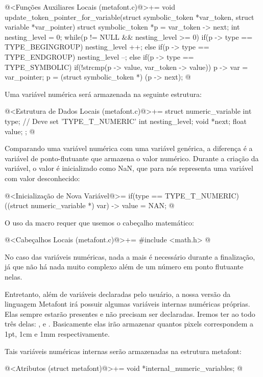 \iniciocodigo
@<Funções Auxiliares Locais (metafont.c)@>+=
void update_token_pointer_for_variable(struct symbolic_token *var_token,
                                      struct variable *var_pointer){
  struct symbolic_token *p = var_token -> next;
  int nesting_level = 0;
  while(p != NULL && nesting_level >= 0){
    if(p -> type == TYPE_BEGINGROUP)
      nesting_level ++;
    else if(p -> type == TYPE_ENDGROUP)
      nesting_level --;
    else if(p -> type == TYPE_SYMBOLIC){
      if(!strcmp(p -> value, var_token -> value)){
        p -> var = var_pointer;
      }
    }
    p = (struct symbolic_token *) (p -> next);
  }
}
@
\fimcodigo


Uma variável numérica será armazenada na seguinte estrutura:

\iniciocodigo
@<Estrutura de Dados Locais (metafont.c)@>+=
struct numeric_variable{
  int type; // Deve set 'TYPE_T_NUMERIC'
  int nesting_level;
  void *next;
  float value;
};
@
\fimcodigo

Comparando uma variável numérica com uma variável genérica, a
diferença é a variável de ponto-flutuante  que
armazena o valor numérico. Durante a criação da variável, o valor é
inicializado como NaN, que para nós representa uma variável com valor
desconhecido:

\iniciocodigo
@<Inicialização de Nova Variável@>=
if(type == TYPE_T_NUMERIC){
  ((struct numeric_variable *) var) -> value = NAN;
}
@
\fimcodigo

O uso da macro  requer que usemos o cabeçalho
matemático:

\iniciocodigo
@<Cabeçalhos Locais (metafont.c)@>+=
#include <math.h>
@
\fimcodigo

No caso das variáveis numéricas, nada a mais é necessário durante a
finalização, já que não há nada muito complexo além de um número em
ponto flutuante nelas.

Entretanto, além de variáveis declaradas pelo usuário, a nossa versão
da linguagem Metafont irá possuir algumas variáveis internas numéricas
próprias. Elas sempre estarão presentes e não precisam ser
declaradas. Iremos ter ao todo três
delas: ,  e . Basicamente
elas irão armazenar quantos pixels correspondem a 1pt, 1cm e 1mm
respectivamente.

Tais variáveis numéricas internas serão armazenadas na estrutura
metafont:

\iniciocodigo
@<Atributos (struct metafont)@>+=
void *internal_numeric_variables;
@
\fimcodigo


